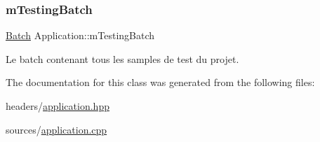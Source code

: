 \mbox{\label{classApplication_a765dbdcf8fa110557c67fb78cffaceb3}} 
\subsubsection{\texorpdfstring{m\+Testing\+Batch}{mTestingBatch}}
{\footnotesize\ttfamily \hyperlink{classApplication_a9888f02149ca3b8ffa499ee07426cd1d}{Batch} Application\+::m\+Testing\+Batch\hspace{0.3cm}{\ttfamily [private]}}



Le batch contenant tous les samples de test du projet. 



The documentation for this class was generated from the following files\+:\begin{DoxyCompactItemize}
\item 
headers/\hyperlink{application_8hpp}{application.\+hpp}\item 
sources/\hyperlink{application_8cpp}{application.\+cpp}\end{DoxyCompactItemize}
